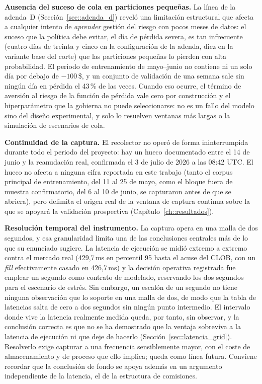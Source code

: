 \textbf{Ausencia del suceso de cola en particiones pequeñas.} La línea de la adenda~D
(Sección~\ref{sec::adenda_d}) reveló una limitación estructural que afecta a cualquier
intento de \emph{aprender} gestión del riesgo con pocos meses de datos: el suceso que la
política debe evitar, el día de pérdida severa, es tan infrecuente (cuatro días de treinta
y cinco en la configuración de la adenda, diez en la variante base del corte) que las
particiones pequeñas lo pierden con alta probabilidad. El periodo de entrenamiento de
mayo--junio no contiene ni un solo día por
debajo de $-100$\,\$, y un conjunto de validación de una semana sale sin ningún día en
pérdida el 43\,\% de las veces. Cuando eso ocurre, el término de aversión al riesgo de la
función de pérdida vale cero por construcción y el hiperparámetro que la gobierna no puede
seleccionarse: no es un fallo del modelo sino del diseño experimental, y solo lo resuelven
ventanas más largas o la simulación de escenarios de cola.

\textbf{Continuidad de la captura.} El recolector no operó de forma ininterrumpida durante
todo el periodo del proyecto: hay un hueco documentado entre el 14 de junio y la
reanudación real, confirmada el 3 de julio de 2026 a las 08:42 UTC. El hueco no afecta a
ninguna cifra reportada en este trabajo (tanto el corpus principal de entrenamiento, del
11 al 25 de mayo, como el bloque fuera de muestra confirmatorio, del 6 al 10 de junio, se
capturaron antes de que se abriera), pero delimita el origen real de la ventana de
captura continua sobre la que se apoyará la validación prospectiva
(Capítulo~\ref{ch::resultados}).

\textbf{Resolución temporal del instrumento.} La captura opera en una malla de dos segundos,
y esa granularidad limita una de las conclusiones centrales más de lo que su enunciado
sugiere. La latencia de ejecución se midió extremo a extremo contra el mercado real
(429{,}7\,ms en percentil 95 hasta el acuse del CLOB, con un \emph{fill} efectivamente casado
en 426{,}7\,ms) y la decisión operativa registrada fue emplear un segundo como contrato de
modelado, reservando los dos segundos para el escenario de estrés. Sin embargo, un escalón de
un segundo no tiene ninguna observación que lo soporte en una malla de dos, de modo que la
tabla de latencias salta de cero a dos segundos sin ningún punto intermedio. El intervalo
donde vive la latencia realmente medida queda, por tanto, sin observar, y la conclusión
correcta es que no se ha demostrado que la ventaja sobreviva a la latencia de ejecución ni
que deje de hacerlo (Sección~\ref{sec::latencia_grid}). Resolverlo exige capturar a una
frecuencia sensiblemente mayor, con el coste de almacenamiento y de proceso que ello implica;
queda como línea futura. Conviene recordar que la conclusión de fondo se apoya además en un
argumento independiente de la latencia, el de la estructura de comisiones.

